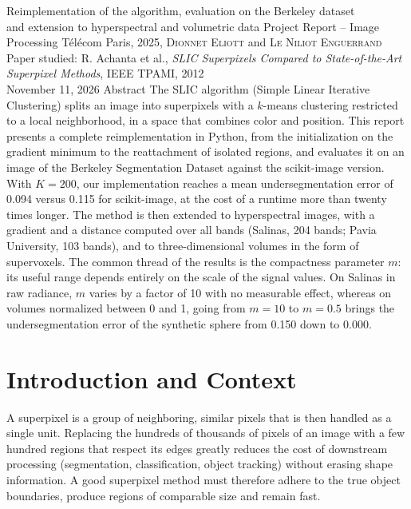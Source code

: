 \newcommand{\langue}{english}


{Reimplementation of the algorithm, evaluation on the Berkeley dataset\\ and extension to hyperspectral and volumetric data}
{Project Report -- Image Processing}
{Télécom Paris, 2025, \textsc{Dionnet Eliott} and \textsc{Le Niliot Enguerrand}\\
Paper studied: R. Achanta et al., \emph{SLIC Superpixels Compared to State-of-the-Art Superpixel Methods}, IEEE TPAMI, 2012\\
November 11, 2026}
{Abstract}
{The SLIC algorithm (Simple Linear Iterative Clustering) splits an image into superpixels with a
$k$-means clustering restricted to a local neighborhood, in a space that combines color and position. This
report presents a complete reimplementation in Python, from the initialization on the gradient minimum
to the reattachment of isolated regions, and evaluates it on an image of the Berkeley Segmentation Dataset
against the scikit-image version. With $K = 200$, our implementation reaches a mean undersegmentation error
of 0.094 versus 0.115 for scikit-image, at the cost of a runtime more than twenty times longer. The
method is then extended to hyperspectral images, with a gradient and a distance computed over all
bands (Salinas, 204 bands; Pavia University, 103 bands), and to three-dimensional volumes in the
form of supervoxels. The common thread of the results is the compactness parameter $m$: its useful range depends
entirely on the scale of the signal values. On Salinas in raw radiance, $m$ varies by a factor of 10 with no
measurable effect, whereas on volumes normalized between 0 and 1, going from $m = 10$ to $m = 0.5$ brings the
undersegmentation error of the synthetic sphere from 0.150 down to 0.000.}

\section{Introduction and Context}
A superpixel is a group of neighboring, similar pixels that is then handled as a single unit.
Replacing the hundreds of thousands of pixels of an image
with a few hundred regions that respect its
edges greatly reduces the cost of downstream processing (segmentation, classification, object tracking) without
erasing shape information. A good superpixel method must therefore adhere to the true object boundaries,
produce regions of comparable size and remain fast.

